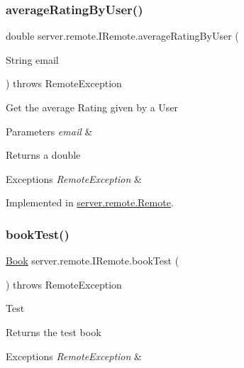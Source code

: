 \subsubsection{\texorpdfstring{average\+Rating\+By\+User()}{averageRatingByUser()}}
{\footnotesize\ttfamily double server.\+remote.\+I\+Remote.\+average\+Rating\+By\+User (\begin{DoxyParamCaption}\item[{String}]{email }\end{DoxyParamCaption}) throws Remote\+Exception}

Get the average Rating given by a User 
\begin{DoxyParams}{Parameters}
{\em email} & \\
\hline
\end{DoxyParams}
\begin{DoxyReturn}{Returns}
a double 
\end{DoxyReturn}

\begin{DoxyExceptions}{Exceptions}
{\em Remote\+Exception} & \\
\hline
\end{DoxyExceptions}


Implemented in \hyperlink{classserver_1_1remote_1_1_remote_a67fc7aeeb889a80cda6e1a5f83858c2a}{server.\+remote.\+Remote}.

\mbox{\label{interfaceserver_1_1remote_1_1_i_remote_a7d561f9f92fb53177f2d3e49e445148a}} 
\subsubsection{\texorpdfstring{book\+Test()}{bookTest()}}
{\footnotesize\ttfamily \hyperlink{classserver_1_1data_1_1_book}{Book} server.\+remote.\+I\+Remote.\+book\+Test (\begin{DoxyParamCaption}{ }\end{DoxyParamCaption}) throws Remote\+Exception}

Test \begin{DoxyReturn}{Returns}
the test book 
\end{DoxyReturn}

\begin{DoxyExceptions}{Exceptions}
{\em Remote\+Exception} & \\
\hline
\end{DoxyExceptions}


